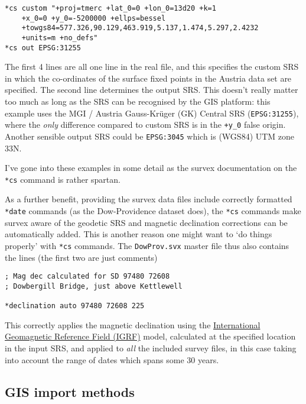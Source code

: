\documentclass[]{article}
\begin{document}
\begin{verbatim}
*cs custom "+proj=tmerc +lat_0=0 +lon_0=13d20 +k=1 
    +x_0=0 +y_0=-5200000 +ellps=bessel 
    +towgs84=577.326,90.129,463.919,5.137,1.474,5.297,2.4232 
    +units=m +no_defs"
*cs out EPSG:31255
\end{verbatim}

The first 4 lines are all one line in the real file, and this 
specifies the custom SRS in which the co-ordinates of the
surface fixed points in the Austria data set are specified. The second
line determines the output SRS. This doesn't really matter too much as
long as the SRS can be recognised by the GIS platform: this example uses
the MGI / Austria Gauss-Kr\"uger (GK) Central SRS (\verb+EPSG:31255+), where the
\emph{only} difference compared to custom SRS is in the \verb:+y_0: false
origin. Another sensible output SRS could be \verb}EPSG:3045} which
is (WGS84) UTM zone 33N.

I've gone into these examples in some detail as the survex documentation
on the \verb}*cs} command is rather spartan.

As a further benefit, providing the survex data files include correctly
formatted \verb}*date} commands (as the Dow-Providence dataset does),
the \verb}*cs} commands make survex aware of the geodetic SRS and
magnetic declination corrections can be automatically added. This is
another reason one might want to `do things properly' with \verb}*cs}
commands. The \verb}DowProv.svx} master file thus also contains the
lines (the first two are just comments)

\begin{verbatim}
; Mag dec calculated for SD 97480 72608
; Dowbergill Bridge, just above Kettlewell

*declination auto 97480 72608 225
\end{verbatim}

This correctly applies the magnetic declination using the
\href{https://en.wikipedia.org/wiki/International_Geomagnetic_Reference_Field}{International
Geomagnetic Reference Field (IGRF)} model, calculated at the specified
location in the input SRS, and applied to \emph{all} the included survey
files, in this case taking into account the range of dates which spans
some 30 years.

\subsection{GIS import methods}\label{gis-import-methods}
\end{document}
